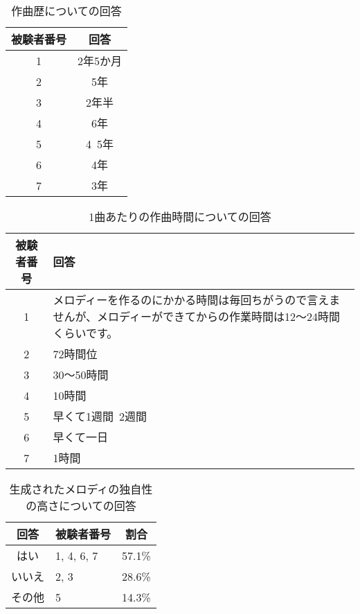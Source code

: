 \begin{table}[htbp]
  \begin{center}
    \caption{作曲歴についての回答}
    \begin{tabular}{cc}
      \hline
      被験者番号 & 回答 \\ \hline \hline
      1 & 2年5か月\rule[-3mm]{0mm}{8mm} \\ \hline
      2 & 5年\rule[-3mm]{0mm}{8mm} \\ \hline
      3 & 2年半\rule[-3mm]{0mm}{8mm} \\ \hline
      4 & 6年\rule[-3mm]{0mm}{8mm} \\ \hline
      5 & 4~5年\rule[-3mm]{0mm}{8mm} \\ \hline
      6 & 4年\rule[-3mm]{0mm}{8mm} \\ \hline
      7 & 3年\rule[-3mm]{0mm}{8mm} \\ \hline
    \end{tabular}
  \end{center}
\end{table}

\begin{table}[htbp]
  \begin{center}
    \caption{1曲あたりの作曲時間についての回答}
    \begin{tabular}{cp{30em}}
      \hline
      被験者番号 & 回答\rule[-3mm]{0mm}{8mm} \\ \hline \hline
      1 & メロディーを作るのにかかる時間は毎回ちがうので言えませんが、メロディーができてからの作業時間は12～24時間くらいです。\rule[-3mm]{0mm}{8mm} \\ \hline
      2 & 72時間位\rule[-3mm]{0mm}{8mm} \\ \hline
      3 & 30〜50時間\rule[-3mm]{0mm}{8mm} \\ \hline
      4 & 10時間\rule[-3mm]{0mm}{8mm} \\ \hline
      5 & 早くて1週間~2週間\rule[-3mm]{0mm}{8mm} \\ \hline
      6 & 早くて一日\rule[-3mm]{0mm}{8mm} \\ \hline
      7 & 1時間\rule[-3mm]{0mm}{8mm} \\ \hline
    \end{tabular}
  \end{center}
\end{table}

\begin{table}[htbp]
  \begin{center}
    \caption{生成されたメロディの独自性の高さについての回答}
    \begin{tabular}{|c|p{10em}|c|}
      \hline
      回答 & 被験者番号 & 割合\rule[-3mm]{0mm}{8mm} \\ \hline \hline
      はい & 1, 4, 6, 7 & 57.1\% \rule[-3mm]{0mm}{8mm} \\ \hline
      いいえ & 2, 3 & 28.6\% \rule[-3mm]{0mm}{8mm} \\ \hline
      その他 & 5 & 14.3\% \rule[-3mm]{0mm}{8mm} \\ \hline
    \end{tabular}
  \end{center}
\end{table}

